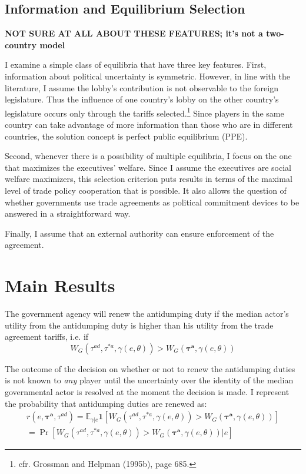 \documentclass[10pt]{article}
\newcommand{\ve}{\theta}
\newcommand{\expect}{\mathbb{E}}
\newcommand{\bta}{\bm{\tau^a}}
\newcommand{\tad}{\tau^{ad}}
\newcommand{\ga}{\gamma}
\begin{document}
\subsection{Information and Equilibrium Selection}
\label{sec:info}

\textbf{NOT SURE AT ALL ABOUT THESE FEATURES; it's not a two-country model}

I examine a simple class of equilibria that have three key features. First, information about political uncertainty is symmetric. However, in line with the literature, I assume the lobby's contribution is not observable to the foreign legislature. Thus the influence of one country's lobby on the other country's legislature occurs only through the tariffs selected.\footnote{cfr. Grossman and Helpman (1995b), page 685.} Since players in the same country can take advantage of more information than those who are in different countries, the solution concept is perfect public equilibrium (PPE).

Second, whenever there is a possibility of multiple equilibria, I focus on the one that maximizes the executives' welfare. Since I assume the executives are social welfare maximizers, this selection criterion puts results in terms of the maximal level of trade policy cooperation that is possible. It also allows the question of whether governments use trade agreements as political commitment devices to be answered in a straightforward way.

Finally, I assume that an external authority can ensure enforcement of the agreement.


\section{Main Results}
\label{sec:main}

The government agency will renew the antidumping duty if the median actor's utility from the antidumping duty is higher than his utility from the trade agreement tariffs, i.e. if
\begin{equation}
  W_G(\tad,\tau^{*a},\ga(e,\ve)) > W_G\left(\bta,\ga(e,\ve)\right)
  \label{eq:lwcg}
\end{equation}
  
The outcome of the decision on whether or not to renew the antidumping duties is not known to \textit{any} player until the uncertainty over the identity of the median governmental actor is resolved at the moment the decision is made. I represent the probability that antidumping duties are renewed as:
\begin{multline}
  r(e,\bta,\tad) = \expect_{\ga|e} \bm{1} [ W_G(\tad,\tau^{*a},\ga(e,\ve)) > W_G\left(\bta,\ga(e,\ve)\right) ] \\ = \Pr [ W_G(\tad,\tau^{*a},\ga(e,\ve)) > W_G\left(\bta,\ga(e,\ve)\right) | e]
  \label{eq:b}
\end{multline}
\end{document}
